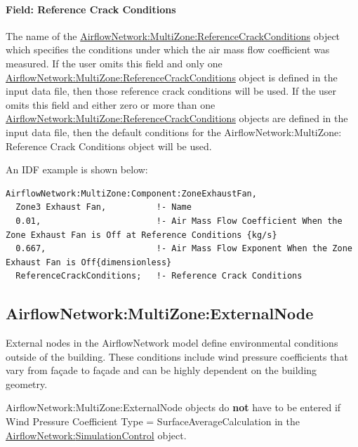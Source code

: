 \paragraph{Field: Reference Crack Conditions}\label{field-reference-crack-conditions-1}

The name of the \hyperref[airflownetworkmultizonereferencecrackconditions]{AirflowNetwork:MultiZone:ReferenceCrackConditions} object which specifies the conditions under which the air mass flow coefficient was measured. If the user omits this field and only one \hyperref[airflownetworkmultizonereferencecrackconditions]{AirflowNetwork:MultiZone:ReferenceCrackConditions} object is defined in the input data file, then those reference crack conditions will be used. If the user omits this field and either zero or more than one \hyperref[airflownetworkmultizonereferencecrackconditions]{AirflowNetwork:MultiZone:ReferenceCrackConditions} objects are defined in the input data file, then the default conditions for the AirflowNetwork:MultiZone: Reference Crack Conditions object will be used.

An IDF example is shown below:

\begin{lstlisting}
AirflowNetwork:MultiZone:Component:ZoneExhaustFan,
  Zone3 Exhaust Fan,          !- Name
  0.01,                       !- Air Mass Flow Coefficient When the Zone Exhaust Fan is Off at Reference Conditions {kg/s}
  0.667,                      !- Air Mass Flow Exponent When the Zone Exhaust Fan is Off{dimensionless}
  ReferenceCrackConditions;   !- Reference Crack Conditions
\end{lstlisting}

\subsection{AirflowNetwork:MultiZone:ExternalNode}\label{airflownetworkmultizoneexternalnode}

External nodes in the AirflowNetwork model define environmental conditions
outside of the building. These conditions include wind pressure coefficients
that vary from fa\c{c}ade to fa\c{c}ade and can be highly dependent on the
building geometry.

AirflowNetwork:MultiZone:ExternalNode objects do \textbf{not} have to be
entered if Wind Pressure Coefficient Type = SurfaceAverageCalculation in the
\hyperref[airflownetworksimulationcontrol]{AirflowNetwork:\hyperref[simulationcontrol]{SimulationControl}} object.

